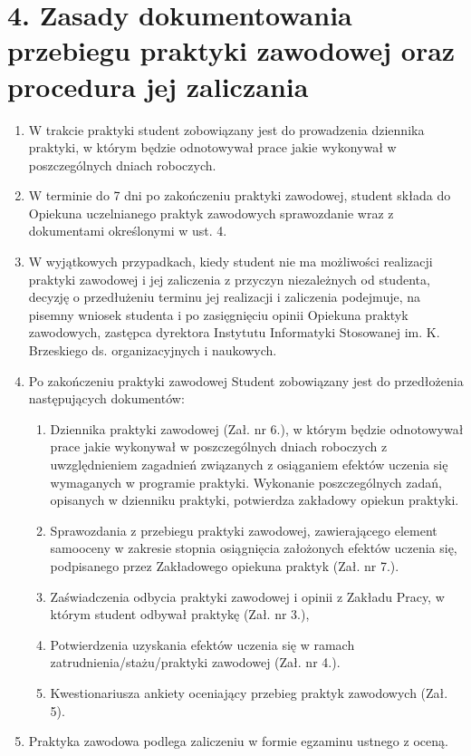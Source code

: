 \documentclass[12pt,a4paper]{article}
\begin{document}
\section*{4. Zasady dokumentowania przebiegu praktyki zawodowej oraz procedura jej zaliczania}
\begin{enumerate}
    \item W trakcie praktyki student zobowiązany jest do prowadzenia dziennika praktyki, w którym będzie odnotowywał prace jakie wykonywał w poszczególnych dniach roboczych.
    \item W terminie do 7 dni po zakończeniu praktyki zawodowej, student składa do Opiekuna uczelnianego praktyk zawodowych sprawozdanie wraz z dokumentami określonymi w ust. 4.
    \item W wyjątkowych przypadkach, kiedy student nie ma możliwości realizacji praktyki zawodowej i jej zaliczenia z przyczyn niezależnych od studenta, decyzję o przedłużeniu terminu jej realizacji i zaliczenia podejmuje, na pisemny wniosek studenta i po zasięgnięciu opinii Opiekuna praktyk zawodowych, zastępca dyrektora Instytutu Informatyki Stosowanej im. K. Brzeskiego ds. organizacyjnych i naukowych.
    \item Po zakończeniu praktyki zawodowej Student zobowiązany jest do przedłożenia następujących dokumentów:
    \begin{enumerate}[label=\alph*)]
        \item Dziennika praktyki zawodowej (Zał. nr 6.), w którym będzie odnotowywał prace jakie wykonywał w poszczególnych dniach roboczych z uwzględnieniem zagadnień związanych z osiąganiem efektów uczenia się wymaganych w programie praktyki. Wykonanie poszczególnych zadań, opisanych w dzienniku praktyki, potwierdza zakładowy opiekun praktyki.
        \item Sprawozdania z przebiegu praktyki zawodowej, zawierającego element samooceny w zakresie stopnia osiągnięcia założonych efektów uczenia się, podpisanego przez Zakładowego opiekuna praktyk (Zał. nr 7.).
        \item Zaświadczenia odbycia praktyki zawodowej i opinii z Zakładu Pracy, w którym student odbywał praktykę (Zał. nr 3.),
        \item Potwierdzenia uzyskania efektów uczenia się w ramach zatrudnienia/stażu/praktyki zawodowej (Zał. nr 4.).
        \item Kwestionariusza ankiety oceniający przebieg praktyk zawodowych (Zał. 5).
    \end{enumerate}
    \item Praktyka zawodowa podlega zaliczeniu w formie egzaminu ustnego z oceną.

\end{enumerate}
\end{document}
